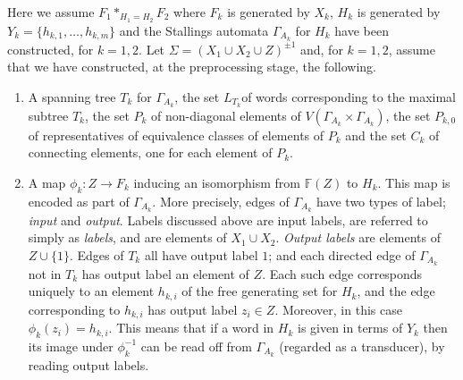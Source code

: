 \documentclass[a4paper,12pt]{article}
\newcommand{\G}{\Gamma }
\renewcommand{\S}{\Sigma }
\numberwithin{equation}{section}
\numberwithin{figure}{section}
\newcommand{\FF}{\ensuremath{\mathbb{F}}}
\newcommand{\maps}{\rightarrow}
\newcommand{\be}{\begin{enumerate}}
\newcommand{\ee}{\end{enumerate}}
\begin{document}
Here we assume $F_1*_{H_1=H_2} F_2$
 where $F_k$ is generated by $X_k$, $H_k$ is generated
by $Y_k=\{h_{k,1},\ldots, h_{k,m}\}$
and the Stallings automata $\G_{A_k}$ for $H_k$ have
been constructed, for $k=1,2$. Let  $\S=(X_1\cup X_2\cup Z)^{\pm 1}$ and, for $k=1,2$,
assume that we have constructed, at the preprocessing stage, the following.
\be
\item
A spanning tree  $T_k$ for $\G_{A_k}$,
 the set $L_{T_k}$of words corresponding to the  maximal subtree $T_k$,
the set $P_k$ of non-diagonal elements of
$V( \G_{A_k}\times \G_{A_k})$,
 the set $P_{k,0}$ of representatives  of equivalence classes of
elements of $P_k$ and the
set $C_k$ of connecting elements, one for each element of $P_k$.
\item A map $\phi_k:Z\maps F_k$  inducing an isomorphism from $\FF(Z)$ to
$H_k$. This map is encoded as part of $\G_{A_k}$. More precisely,
edges of $\G_{A_k}$ have two types of label; \emph{input} and \emph{output}.
Labels discussed above are input labels, are
referred to simply as \emph{labels}, and are elements of $X_1\cup X_2$.
\emph{Output labels} are elements of  $Z\cup \{1\}$.
 Edges of $T_k$  all have output label $1$; and each directed
edge of $\G_{A_k}$ not in $T_k$ has output
label an element of $Z$. Each such edge corresponds uniquely to
 an element $h_{k,i}$ of the free generating set for $H_k$, and the edge
corresponding to $h_{k,i}$ has
 output label  $z_i\in Z$. Moreover, in this case $\phi_k(z_i)=h_{k,i}$.
  This means that if a word in $H_k$ is given in terms of $Y_k$  then its
image under $\phi_k^{-1}$ can be read off from $\G_{A_k}$ (regarded as a
 transducer), by reading output labels.
\ee
\end{document}
